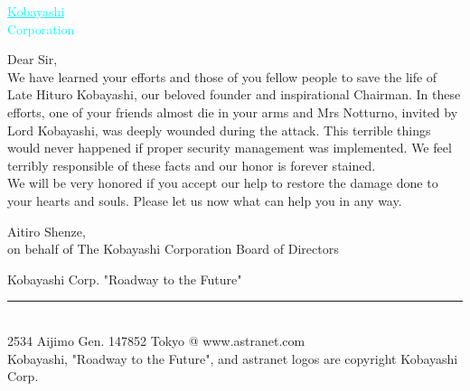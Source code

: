 \documentclass[11pt,twoside,a4paper]{book}
\begin{document}
\clearpage

\begin{flushright}
	\textcolor{cyan}{\Huge \underline{Kobayashi} }~\\
	\textcolor{cyan}{\Huge Corporation}
\end{flushright}

\vfill

\begin{spacing}{2.0}

Dear Sir,~\\

We have learned your efforts and those of you fellow people to save the life of Late Hituro Kobayashi, our beloved founder and inspirational Chairman. In these efforts, one of your friends almost die in your arms and Mrs Notturno, invited by Lord Kobayashi, was deeply wounded during the attack. This terrible things would never happened if proper security management was implemented. We feel terribly responsible of these facts and our honor is forever stained. ~\\

We will be very honored if you accept our help to restore the damage done to your hearts and souls. Please let us now what can help you in any way. ~\\

\begin{flushright}
	Aitiro Shenze,~\\
	on behalf of The Kobayashi Corporation Board of Directors
\end{flushright}

\end{spacing}

\vfill

\begin{center}
{\small Kobayashi Corp. "Roadway to the Future" }
\hrule~\\ %
{\small 2534 Aijimo Gen. 147852 Tokyo @ www.astranet.com }~\\
{\footnotesize Kobayashi, "Roadway to the Future", and astranet logos are copyright Kobayashi Corp. }~\\
\end{center}

\clearpage
\end{document}
